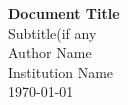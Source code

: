 \documentclass[12pt]{report}
\begin{document}
\begin{titlepage}
\centering
\vspace*{2cm}
{\LARGE \textbf {Document Title}}\\[1cm]
{\large Subtitle(if any}\\[2cm]
{\large Author Name} \\ [0.5cm]
{\large Institution Name} \\[0.5cm]
{\large \today }
\end{titlepage}
\end{document}
